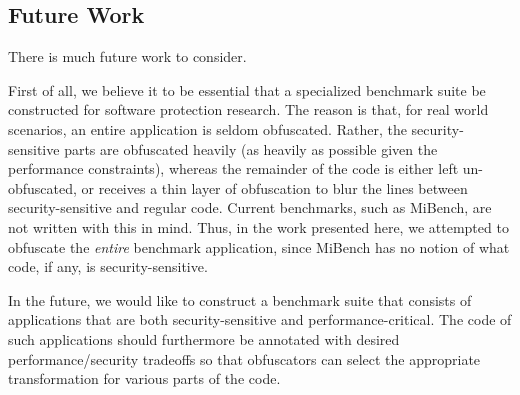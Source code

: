 \subsection{Future Work}
There is much future work to consider.

First of all, we believe it to be essential that a specialized benchmark suite be constructed for software protection research. The reason is that, for real world scenarios, an entire application is seldom obfuscated. Rather, the security-sensitive parts are obfuscated heavily (as heavily as possible given the performance constraints), whereas the remainder of the code is either left un-obfuscated, or receives a thin layer of obfuscation to blur the lines between security-sensitive and regular code. Current benchmarks, such as MiBench, are not written with this in mind. Thus, in the work presented here, we attempted to obfuscate the {\em entire} benchmark application, since MiBench has no notion of what code, if any, is security-sensitive. 

In the future, we would like to construct a benchmark suite that consists of applications that are both security-sensitive and performance-critical. The code of such applications should furthermore be annotated with desired performance/security tradeoffs so that obfuscators can select the appropriate transformation for various parts of the code.

\endinput

\emph{\textbf{Function-level Obfuscation:}}

 Applications can be obfuscated either at the entire source code or individual function level. While this work considered the energy profiling and analysis of applications when entire source code is obfuscated, we plan to investigate  function-level obfuscation as part of future work. Since obfuscating each of the individual functions can incur significant performance and energy overhead, it is imperative that functions can be ranked depending on the criticality and $k$-critical functions can be obfuscated where $k$ lies between $1$ and $n$ and $n$ denotes the number of functions in the program.  
 

\emph{\textbf{Application-aware Obfuscation:}}

Our initial analysis revealed that obfuscation incurred a significant increase in energy consumption and execution time. Thus a need for efficient allocation of resources so as to minimize the power consumed due to obfuscation becomes necessary. This is further exacerbated when systems need to meet a given power budget while balancing the performance and power consumption of the devices. Thus, we claim the need for application-aware obfuscation which develops heuristics for obfuscation considering the needs of applications while meeting a power budget.   

